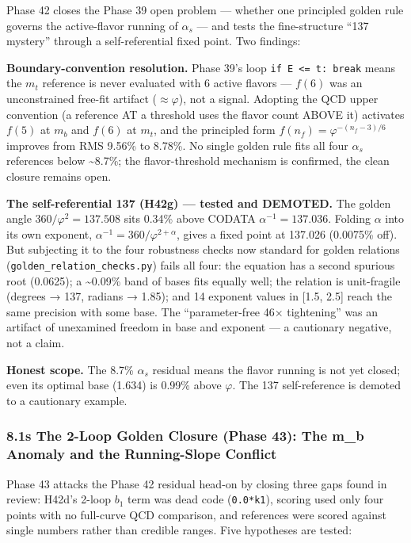 \documentclass[
]{article}
\begin{document}
Phase 42 closes the Phase 39 open problem --- whether one principled
golden rule governs the active-flavor running of \(\alpha_s\) --- and
tests the fine-structure ``137 mystery'' through a self-referential
fixed point. Two findings:

\textbf{Boundary-convention resolution.} Phase 39's loop
\texttt{if\ E\ \textless{}=\ t:\ break} means the \(m_t\) reference is
never evaluated with 6 active flavors --- \(f(6)\) was an unconstrained
free-fit artifact (\(\approx \varphi\)), not a signal. Adopting the QCD
upper convention (a reference AT a threshold uses the flavor count ABOVE
it) activates \(f(5)\) at \(m_b\) and \(f(6)\) at \(m_t\), and the
principled form \(f(n_f) = \varphi^{-(n_f-3)/6}\) improves from RMS
9.56\% to 8.78\%. No single golden rule fits all four \(\alpha_s\)
references below \textasciitilde8.7\%; the flavor-threshold mechanism is
confirmed, the clean closure remains open.

\textbf{The self-referential 137 (H42g) --- tested and DEMOTED.} The
golden angle \(360/\varphi^2 = 137.508\) sits 0.34\% above CODATA
\(\alpha^{-1} = 137.036\). Folding \(\alpha\) into its own exponent,
\(\alpha^{-1} = 360/\varphi^{2+\alpha}\), gives a fixed point at 137.026
(0.0075\% off). But subjecting it to the four robustness checks now
standard for golden relations (\texttt{golden\_relation\_checks.py})
fails all four: the equation has a second spurious root (0.0625); a
\textasciitilde0.09\% band of bases fits equally well; the relation is
unit-fragile (degrees → 137, radians → 1.85); and 14 exponent values in
{[}1.5, 2.5{]} reach the same precision with some base. The
``parameter-free 46× tightening'' was an artifact of unexamined freedom
in base and exponent --- a cautionary negative, not a claim.

\textbf{Honest scope.} The 8.7\% \(\alpha_s\) residual means the flavor
running is not yet closed; even its optimal base (1.634) is 0.99\% above
\(\varphi\). The 137 self-reference is demoted to a cautionary example.

\subsubsection{8.1s The 2-Loop Golden Closure (Phase 43): The m\_b
Anomaly and the Running-Slope
Conflict}\label{s-the-2-loop-golden-closure-phase-43-the-m_b-anomaly-and-the-running-slope-conflict}

Phase 43 attacks the Phase 42 residual head-on by closing three gaps
found in review: H42d's 2-loop \(b_1\) term was dead code
(\texttt{0.0*k1}), scoring used only four points with no full-curve QCD
comparison, and references were scored against single numbers rather
than credible ranges. Five hypotheses are tested:
\end{document}
